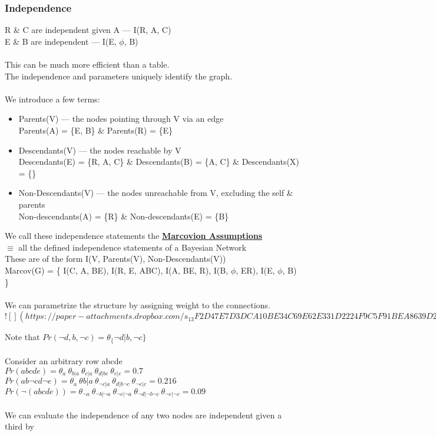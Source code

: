 \documentclass[../../lecture_notes.tex]{subfiles}
\begin{document}
\subsubsection*{Independence}
\noindent R \& C are independent given A — I(R, A, C)\\
E \& B are independent — I(E, $\phi$, B)\\
\\
This can be much more efficient than a table.\\
The independence and parameters uniquely identify the graph.\\
\\
We introduce a few terms:
\begin{itemize} [itemsep=0mm]
	\item Parents(V) — the nodes pointing through V via an edge\\
		Parents(A) = \{E, B\} \& Parents(R) = \{E\}
	\item Descendants(V) — the nodes reachable by V\\
           	Descendants(E) = \{R, A, C\} \& Descendants(B) = \{A, C\} \& Descendants(X) = \{\}
	\item Non-Descendants(V) — the nodes unreachable from V, excluding the self \& parents\\
		Non-descendants(A) = \{R\} \& Non-descendants(E) = \{B\}
\end{itemize}

\noindent We call these independence statements the \textbf{\underline{Marcovion Assumptions}}\\
	\indent $\equiv$ all the defined independence statements of a Bayesian Network\\
	\indent These are of the form I(V, Parents(V), Non-Descendants(V))\\
Marcov(G) = \{ I(C, A, BE), I(R, E, ABC), I(A, BE, R), I(B, $\phi$, ER), I(E, $\phi$, B) \}\\
\\
We can parametrize the structure by assigning weight to the connections.\\

\newpage
$![](https://paper-attachments.dropbox.com/s_13F2D47E7D3DCA10BE34C69E62E331D2224F9C5F91BEA8639D242F2792B86517_1590117208298_Screen+Shot+2020-05-21+at+8.13.19+PM.png)$
\newpage

\noindent Note that $Pr(\neg d, b, \neg c) = \theta_\{\neg d | b, \neg c\}$\\
\\
Consider an arbitrary row abcde \\ 
\indent $Pr(abcde) =\theta_a\ \theta_{b|a}\ \theta_{c|a}\ \theta_{d|bc}\ \theta_{e|c} = 0.7$\\
\indent $Pr(ab\neg cd\neg e) =\theta_{a}\ \theta{b|a}\ \theta_{\neg c|a}\ \theta_{d|b\neg c}\ \theta_{\neg e|c} = 0.216$\\
\indent $Pr(\neg(abcde)) = \theta_{\neg a}\ \theta_{\neg b|\neg a}\ \theta_{\neg c|\neg a}\
	\theta_{\neg d|\neg b\neg c}\ \theta_{\neg e|\neg c} = 0.09$\\
\\
We can evaluate the independence of any two nodes are independent given a third by
\end{document}
